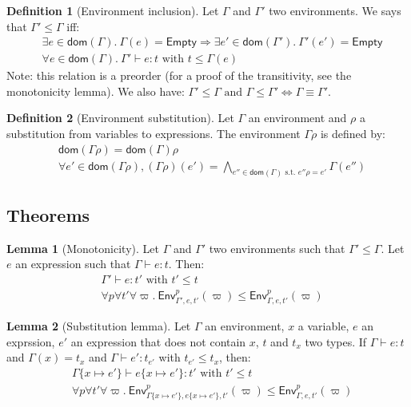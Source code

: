 \documentclass[a4paper]{article}%
\newcommand{\dom}[1]{\textsf{dom}(#1)}
\newcommand{\Empty} {\textsf{Empty}}%
\newcommand{\subst}[2]{\{#1 \mapsto #2\}}
\newcommand{\Gp}[2]{\textsf{Env}^{#1}_{#2}}
\theoremstyle{definition}
\newtheorem{lemma}{Lemma}
\newtheorem{definition}{Definition}
\begin{document}
  \begin{definition}[Environment inclusion]
    Let $\Gamma$ and $\Gamma'$ two environments. We says that $\Gamma' \leq \Gamma$ iff:
    \begin{align*}
      &\exists e\in \dom \Gamma.\ \Gamma(e)=\Empty \Rightarrow \exists e'\in \dom {\Gamma'}.\ \Gamma'(e')=\Empty\\
      &\forall e \in \dom \Gamma.\ \Gamma' \vdash e : t \text{ with } t \leq \Gamma(e)
    \end{align*}
    Note: this relation is a preorder (for a proof of the transitivity, see the monotonicity lemma).
    We also have: $\Gamma' \leq \Gamma \text{ and } \Gamma \leq \Gamma' \Leftrightarrow \Gamma \equiv \Gamma'$.
  \end{definition}

  \begin{definition}[Environment substitution]
    Let $\Gamma$ an environment and $\rho$ a substitution from variables to expressions.
    The environment $\Gamma\rho$ is defined by:
    \begin{align*}
      &\dom {\Gamma\rho} = \dom \Gamma \rho\\
      &\forall e' \in \dom {\Gamma\rho}, (\Gamma\rho)(e') = \bigwedge_{e'' \in \dom \Gamma \text{ s.t. } e''\rho=e'}\Gamma(e'')
    \end{align*}
  \end{definition}

    \subsection{Theorems}

    \begin{lemma}[Monotonicity]
      Let $\Gamma$ and $\Gamma'$ two environments such that $\Gamma' \leq \Gamma$. Let $e$ an expression such that $\Gamma \vdash e:t$.
      Then:\\
      \begin{align*}
        &\Gamma' \vdash e:t' \text{ with } t' \leq t\\
        &\forall p \forall t' \forall \varpi.\ \Gp p {\Gamma',e,t'} (\varpi) \leq \Gp p {\Gamma,e,t'} (\varpi)
      \end{align*}
    \end{lemma}

    \begin{lemma}[Substitution lemma]
      Let $\Gamma$ an environment, $x$ a variable, $e$ an exprssion, $e'$ an expression that does not contain $x$, $t$ and $t_x$ two types.
      If $\Gamma \vdash e:t$ and $\Gamma(x) = t_x$ and $\Gamma \vdash e':t_{e'}$ with $t_{e'} \leq t_x$, then:
      \begin{align*}
        &\Gamma \subst x {e'} \vdash e \subst x {e'}:t' \text{ with } t'\leq t\\
        &\forall p \forall t' \forall \varpi.\ \Gp p {\Gamma\subst x {e'},e\subst x {e'},t'} (\varpi) \leq \Gp p {\Gamma,e,t'} (\varpi)
      \end{align*}
    \end{lemma}
\end{document}
